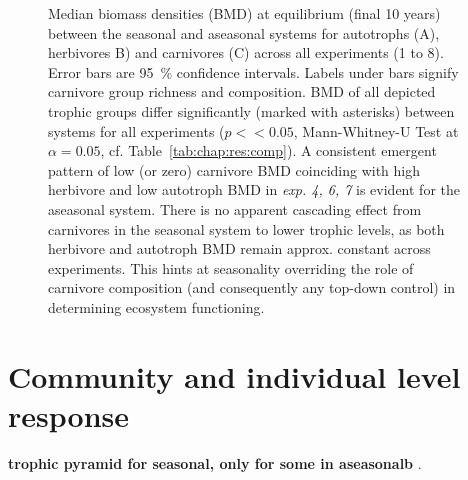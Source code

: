 \begin{figure}
\centering

\caption[Comparison median biomass density (BMD) for aseasonal and seasonal ecosystems]{Median biomass densities (BMD) at equilibrium (final 10 years) between the seasonal and aseasonal systems for autotrophs (A), herbivores B) and carnivores (C) across all experiments (1 to 8). Error bars are 95~\% confidence intervals. Labels under bars signify carnivore group richness and composition. BMD of all depicted trophic groups differ significantly (marked with asterisks) between systems for all experiments ($p << 0.05$, Mann-Whitney-U Test at $\alpha = 0.05$, cf. Table~\ref{tab:chap:res:comp}).%
 A consistent emergent pattern of low (or zero) carnivore BMD coinciding with high herbivore and low autotroph BMD in \textit{exp. 4, 6, 7} is evident for the aseasonal system.
   There is no apparent cascading effect from carnivores in the seasonal system  to lower trophic levels, as both herbivore and autotroph BMD remain approx. constant across experiments.
  This hints at seasonality overriding the role of carnivore composition (and consequently any top-down control) in determining ecosystem functioning. }
\label{fig:chap:res:dyn:comp}
\end{figure}




\section{Community and individual level response}
\label{chap:res:popind}
%
\textbf{trophic pyramid for seasonal, only for some in aseasonalb}
.
